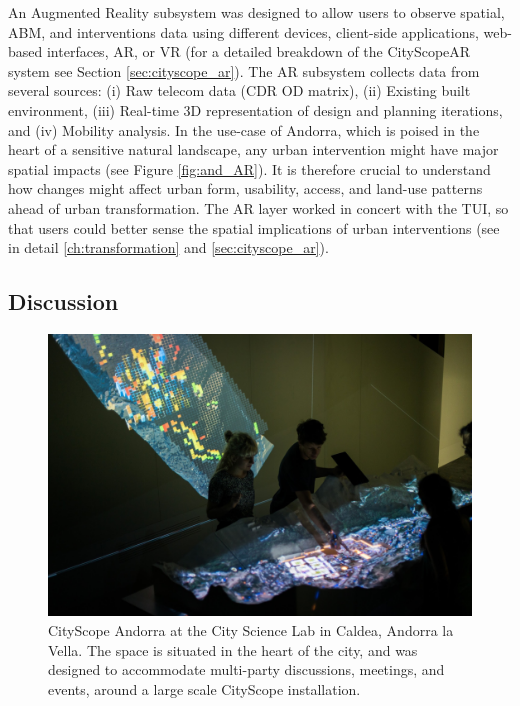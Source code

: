 {{{            An Augmented Reality subsystem was designed to allow users to observe spatial, ABM, and interventions data using different devices, client-side applications, web-based interfaces, AR, or VR \cite{noyman2018CityScopeARUD} (for a detailed breakdown of the CityScopeAR system see Section \eqref{sec:cityscope_ar}). The AR subsystem collects data from several sources: (i) Raw telecom data (CDR OD matrix), (ii) Existing built environment, (iii) Real-time 3D representation of design and planning iterations, and (iv) Mobility analysis. In the use-case of Andorra, which is poised in the heart of a sensitive natural landscape, any urban intervention might have major spatial impacts (see Figure \eqref{fig:and_AR}). It is therefore crucial to understand how changes might affect urban form, usability, access, and land-use patterns ahead of urban transformation. The AR layer worked in concert with the TUI, so that users could better sense the spatial implications of urban interventions (see in detail \eqref{ch:transformation} and \eqref{sec:cityscope_ar}).
        }
    }

    \subsection{Discussion}
    {

        \begin{figure}[h]
            \begin{center}
                \includegraphics[width=1\textwidth]{chapters/insight/and_abm/figures/and_cs_ppl.jpeg}
            \end{center}
            \caption{CityScope Andorra at the City Science Lab in Caldea, Andorra la Vella. The space is situated in the heart of the city, and was designed to accommodate multi-party discussions, meetings, and events, around a large scale CityScope installation.}
            \label{fig:and_cityscope_ppl}
        \end{figure}


}}
